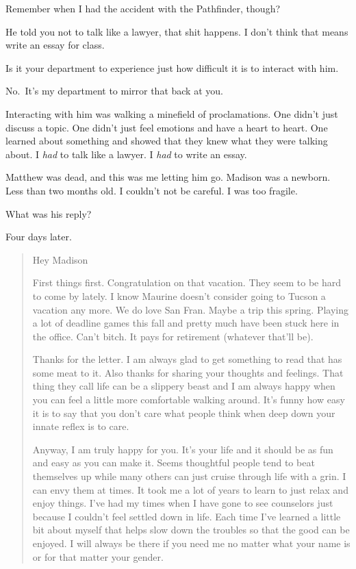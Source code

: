 \begin{paracol}{2}
\begin{leftcolumn}
Remember when I had the accident with the Pathfinder, though?

\begin{ally}
He told you not to talk like a lawyer, that shit happens. I don't think that means write an essay for class.
\end{ally}
Is it your department to experience just how difficult it is to interact with him.

\begin{ally}
No.~It's my department to mirror that back at you.
\end{ally}
Interacting with him was walking a minefield of proclamations. One didn't just discuss a topic. One didn't just feel emotions and have a heart to heart. One learned about something and showed that they knew what they were talking about. I \emph{had} to talk like a lawyer. I \emph{had} to write an essay.

Matthew was dead, and this was me letting him go. Madison was a newborn. Less than two months old. I couldn't not be careful. I was too fragile.

\begin{ally}
What was his reply?
\end{ally}
Four days later.

\begin{quotation}
\noindent Hey Madison

First things first. Congratulation on that vacation. They seem to be hard to come by lately. I know Maurine doesn't consider going to Tucson a vacation any more. We do love San Fran. Maybe a trip this spring. Playing a lot of deadline games this fall and pretty much have been stuck here in the office. Can't bitch. It pays for retirement (whatever that'll be).

Thanks for the letter. I am always glad to get something to read that has some meat to it. Also thanks for sharing your thoughts and feelings. That thing they call life can be a slippery beast and I am always happy when you can feel a little more comfortable walking around. It's funny how easy it is to say that you don't care what people think when deep down your innate reflex is to care.

Anyway, I am truly happy for you. It's your life and it should be as fun and easy as you can make it. Seems thoughtful people tend to beat themselves up while many others can just cruise through life with a grin. I can envy them at times.  It took me a lot of years to learn to just relax and enjoy things. I've had my times when I have gone to see counselors just because I couldn't feel settled down in life. Each time I've learned a little bit about myself that helps slow down the troubles so that the good can be enjoyed. I will always be there if you need me no  matter what your name is or for that matter your gender.


\end{quotation}
\end{leftcolumn}
\end{paracol}
